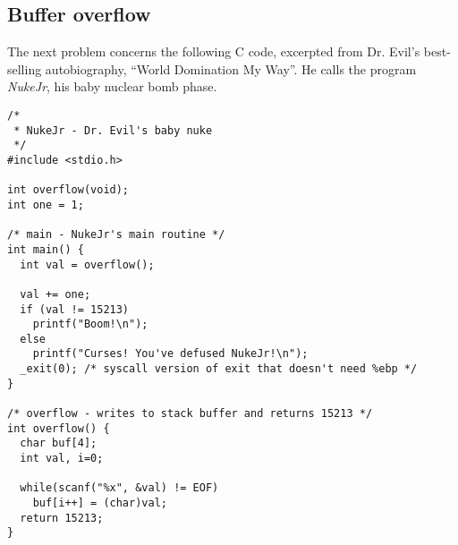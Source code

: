 \subsection*{Buffer overflow}

The next problem concerns the following C code, excerpted from
Dr. Evil's best-selling autobiography, ``World Domination My Way''.
He calls the program {\em NukeJr}, his baby nuclear bomb phase.

{\small
\begin{verbatim}
/*
 * NukeJr - Dr. Evil's baby nuke
 */
#include <stdio.h>

int overflow(void);
int one = 1; 

/* main - NukeJr's main routine */
int main() {
  int val = overflow();

  val += one;
  if (val != 15213) 
    printf("Boom!\n");
  else
    printf("Curses! You've defused NukeJr!\n");
  _exit(0); /* syscall version of exit that doesn't need %ebp */
}

/* overflow - writes to stack buffer and returns 15213 */
int overflow() {
  char buf[4];
  int val, i=0;

  while(scanf("%x", &val) != EOF) 
    buf[i++] = (char)val; 
  return 15213;
}
\end{verbatim}}

\newpage
